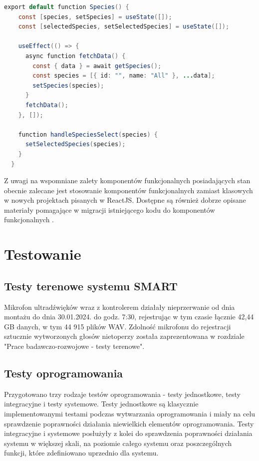 \documentclass{sprz}
\begin{document}
\begin{lstlisting}[language=Java,caption={Przykład komponentu funkcjonalnego}, label={lst:functional_component}]
  export default function Species() {
    const [species, setSpecies] = useState([]);
    const [selectedSpecies, setSelectedSpecies] = useState([]);
  
    useEffect(() => {
      async function fetchData() {
        const { data } = await getSpecies();
        const species = [{ id: "", name: "All" }, ...data];
        setSpecies(species);
      }
      fetchData();
    }, []);
  
    function handleSpeciesSelect(species) {
      setSelectedSpecies(species);
    }
  }
\end{lstlisting}

Z uwagi na wspomniane zalety komponentów funkcjonalnych posiadających stan obecnie zalecane jest stosowanie komponentów funkcjonalnych zamiast klasowych w nowych projektach pisanych w ReactJS. Dostępne są również dobrze opisane materiały pomagające w migracji istniejącego kodu do komponentów funkcjonalnych \cite{react-component}.

\chapter{Testowanie}

\section{Testy terenowe systemu SMART}
Mikrofon ultradźwięków wraz z kontrolerem działały nieprzerwanie od dnia montażu do dnia 30.01.2024. do godz. 7:30, rejestrując w tym czasie łącznie 42,44 GB danych, w tym 44 915 plików WAV.
Zdolność mikrofonu do rejestracji sztucznie wytworzonych głosów nietoperzy została zaprezentowana w rozdziale "Prace badawczo-rozwojowe - testy terenowe".

\section{Testy oprogramowania}
Przygotowano trzy rodzaje testów oprogramowania - testy jednostkowe, testy integracyjne i testy systemowe. Testy jednostkowe są klasycznie implementowanymi testami podczas wytwarzania oprogramowania i miały na celu sprawdzenie poprawności działania niewielkich elementów oprogramowania. Testy integracyjne i systemowe posłużyły z kolei do sprawdzenia poprawności działania systemu w większej skali, na poziomie całego systemu oraz poszczególnych funkcji, które zdefiniowano uprzednio dla systemu.
\end{document}
